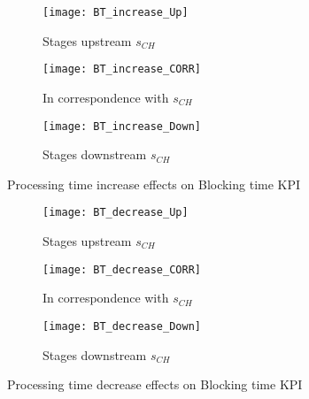 \begin{landscape}
\begin{figure}[p]
  \centering
  \begin{subfigure}[t]{0.4\textwidth}
    \texttt{[image: BT\_increase\_Up]}
    \caption{Stages upstream $s_{CH}$}
    \label{fig:Processing time increase effects on Blocking time KPI - Stages upstream}   
  \end{subfigure}
  \begin{subfigure}[t]{0.4\textwidth}
    \texttt{[image: BT\_increase\_CORR]}
    \caption{In correspondence with $s_{CH}$}
    \label{fig:Processing time increase effects on Blocking time KPI - In correspondence with}   
  \end{subfigure}
  \begin{subfigure}[t]{0.4\textwidth}
    \texttt{[image: BT\_increase\_Down]}
    \caption{Stages downstream $s_{CH}$}
    \label{fig:Processing time increase effects on Blocking time KPI - Stages downstream}   
  \end{subfigure}
  \caption{Processing time increase effects on Blocking time KPI}
  \label{fig:Processing time increase effects on Blocking time KPI}
\end{figure}
\begin{figure}[p]
  \centering
  \begin{subfigure}[b]{0.4\textwidth}
    \texttt{[image: BT\_decrease\_Up]}
    \caption{Stages upstream $s_{CH}$}
    \label{fig:Processing time decrease effects on Blocking time KPI - Stages upstream}   
  \end{subfigure}
  \begin{subfigure}[b]{0.4\textwidth}
    \texttt{[image: BT\_decrease\_CORR]}
    \caption{In correspondence with $s_{CH}$}
    \label{fig:Processing time decrease effects on Blocking time KPI - In correspondence with}   
  \end{subfigure}
  \begin{subfigure}[b]{0.4\textwidth}
    \texttt{[image: BT\_decrease\_Down]}
    \caption{Stages downstream $s_{CH}$}
    \label{fig:Processing time decrease effects on Blocking time KPI - Stages downstream}   
  \end{subfigure}
  \caption{Processing time decrease effects on Blocking time KPI}
  \label{fig:Processing time decrease effects on Blocking time KPI}
\end{figure}
\end{landscape}
